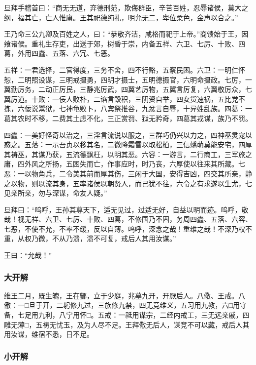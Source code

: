 \documentclass[]{article}
\begin{document}
旦拜手稽首曰：``商无无道，弃德刑范，欺侮群臣，辛苦百姓，忍辱诸侯，莫大之纲，福其亡，亡人惟庸。王其祀德纯礼，明允无二，卑位柔色，金声以合之。''

王乃命三公九卿及百姓之人，曰：``恭敬齐洁，咸格而祀于上帝。''商馈始于王，因飨诸侯。重礼生存吏，出送于郊，树昏于崇，内备五祥、六卫、七厉、十败、四葛，外用四蠹、五落、六冗、七恶。

五祥：一君选择，二官得度，三务不舍，四不行赂，五察民困。六卫：一明仁怀恕，二明照设谋，三明戒摄勇，四明才摄士，五明德摄官，六明命摄政。七厉，一翼勤厉务，二动正厉民，三静兆厉武，四翼艺厉物，五翼言厉复，六翼敬厉众，七翼厉道。十败：一佞人败朴，二谄言毁积，三阴资自举，四女货速祸，五比党不拣，六佞说鬻狱，七神龟败卜，八宾祭推谷，九忿言自辱，十异姓乱族。四葛：一葛其农时不移，二费其土虑不化，三正赏罚、狱无矜奇，四葛其戎谋，族乃不罚。

四蠹：一美好怪奇以治之，三淫言流说以服之，三群巧仍兴以力之，四神巫灵宠以惑之。五落：一示吾贞以移其名，二微降霜雪以取松柏，三信蟜萌莫能安宅，四厚其祷巫，其谋乃获，五流德飘枉，以明其恶。六容：一游言，二行商工，三军旅之庸，四外风之所扬，五困失而亡，作事应时，时乃丧，六厚使以往来其所藏。七恶：一以物角兵，二令美其前而厚其伤，三闲于大国，安得吉凶，四交其所亲，静之以物，则以流其身，五率诸侯以朝贤人，而己犹不往，六令之有求遂以生尤，七见亲所亲，勿与深谋，命友人疑。''

旦拜曰：``呜呼，王孙其尊天下，适无见过，过适无好，自益以明而迹。呜呼，敬哉！视无祥、六卫、七厉、十败、四葛，不修国乃不固，务周四蠹、五落、六容、七恶，不使不允，不率不缓，反以自薄。呜呼，深念之哉！重维之哉！不深乃权不重，从权乃微，不从乃溃，溃不可复，戒后人其用汝谋。''

王曰：``允哉！''

\hypertarget{header-n135}{%
\subsubsection{大开解}\label{header-n135}}

维王二月，既生魄，王在酆，立于少庭，兆墓九开，开厥后人。八儆、王戒。八儆：一□旦于开，二躬修九过，三族修九禁，四无竞维义，五习用九教，六□用守备，七足用九利，八宁用怀□。五戒：一祗用谋宗，二经内戒工，三无远亲戚，四雕无薄□，五祷无忧玉，及为人尽不足。王拜儆无后人，谋竞不可以藏，戒后人其用汝谋，维宿不悉，日不足。

\hypertarget{header-n139}{%
\subsubsection{小开解}\label{header-n139}}
\end{document}

